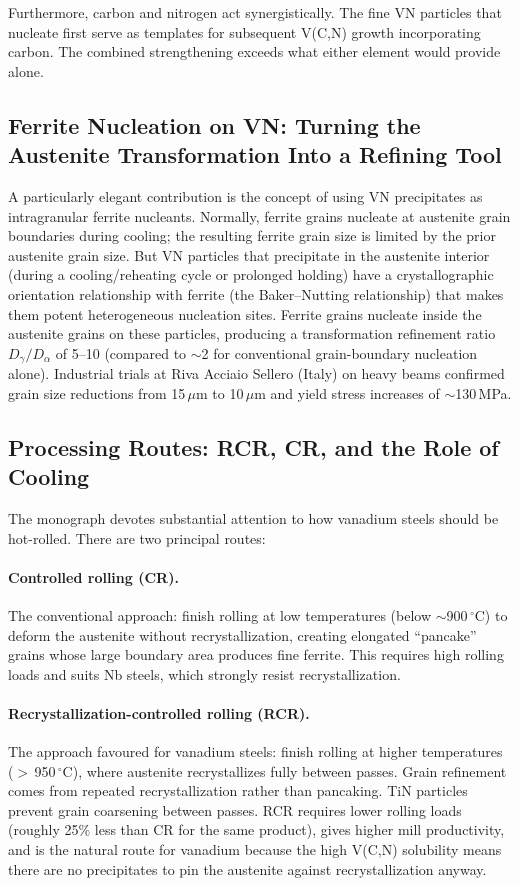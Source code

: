 \documentclass[11pt,a4paper]{article}
\begin{document}
Furthermore, carbon and nitrogen act synergistically.  The fine VN
particles that nucleate first serve as templates for subsequent V(C,N)
growth incorporating carbon.  The combined strengthening exceeds what
either element would provide alone.

\subsection{Ferrite Nucleation on VN: Turning the Austenite Transformation Into a Refining Tool}

A particularly elegant contribution is the concept of using VN
precipitates as intragranular ferrite nucleants.  Normally, ferrite grains
nucleate at austenite grain boundaries during cooling; the resulting
ferrite grain size is limited by the prior austenite grain size.  But VN
particles that precipitate in the austenite interior (during a
cooling/reheating cycle or prolonged holding) have a crystallographic
orientation relationship with ferrite (the Baker--Nutting relationship)
that makes them potent heterogeneous nucleation sites.  Ferrite grains
nucleate inside the austenite grains on these particles, producing a
transformation refinement ratio $D_\gamma/D_\alpha$ of 5--10 (compared to
$\sim$2 for conventional grain-boundary nucleation alone).  Industrial
trials at Riva Acciaio Sellero (Italy) on heavy beams confirmed grain
size reductions from 15\,$\mu$m to 10\,$\mu$m and yield stress increases
of $\sim$130\,MPa.

\subsection{Processing Routes: RCR, CR, and the Role of Cooling}

The monograph devotes substantial attention to how vanadium steels should
be hot-rolled.  There are two principal routes:

\paragraph{Controlled rolling (CR).} The conventional approach: finish
rolling at low temperatures (below $\sim$900\,${}^\circ$C) to deform the
austenite without recrystallization, creating elongated ``pancake'' grains
whose large boundary area produces fine ferrite.  This requires high
rolling loads and suits Nb steels, which strongly resist
recrystallization.

\paragraph{Recrystallization-controlled rolling (RCR).}  The approach
favoured for vanadium steels: finish rolling at higher temperatures
($>$\,950\,${}^\circ$C), where austenite recrystallizes fully between
passes.  Grain refinement comes from repeated recrystallization rather
than pancaking.  TiN particles prevent grain coarsening between passes.
RCR requires lower rolling loads (roughly 25\% less than CR for the same
product), gives higher mill productivity, and is the natural route for
vanadium because the high V(C,N) solubility means there are no
precipitates to pin the austenite against recrystallization anyway.
\end{document}
